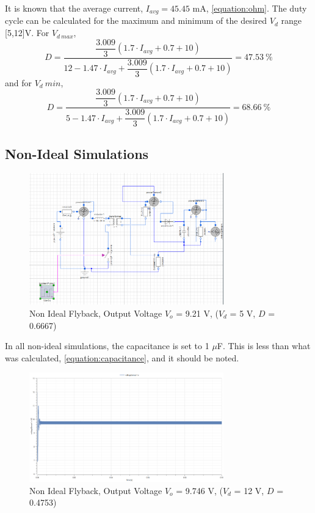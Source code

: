 \documentclass[12pt,twoside]{scrartcl}
\begin{document}
    It is known that the average current, $I_{avg} = 45.45$ mA, \ref{equation:ohm}. The duty cycle can 
    be calculated for the maximum and minimum of the desired $V_d$ range [5,12]V. For $V_{d\:max}$,
    \begin{equation}
        D  = \frac{\dfrac{3.009}{3}(1.7\cdot I_{avg} + 0.7 + 10)}{12 - 1.47\cdot I_{avg} + \dfrac{3.009}{3}(1.7\cdot I_{avg} + 0.7 + 10)} = 47.53\: \%
    \end{equation}
    and for $V_d\:min$,
    \begin{equation}
        D  = \frac{\dfrac{3.009}{3}(1.7\cdot I_{avg} + 0.7 + 10)}{5 - 1.47\cdot I_{avg} + \dfrac{3.009}{3}(1.7\cdot I_{avg} + 0.7 + 10)} = 68.66\: \%
    \end{equation}

\newpage

\subsection{Non-Ideal Simulations}

\begin{figure}[htp]
    \centering
    \includegraphics[width=0.75\textwidth]{ModellicaNonIdeal.PNG}
    \caption{Non Ideal Flyback, Output Voltage $V_o$ = 9.21 V, ($V_d$ = 5 V, $D$ = 0.6667)}
    \label{fig:NonIdealModellica}
\end{figure}
\noindent
In all non-ideal simulations, the capacitance is set to 1 $\mu$F. This is less than what was calculated, \ref{equation:capacitance}, and it should be noted.

\newpage
\begin{figure}[htp]
    \centering
    \includegraphics[width=0.75\textwidth]{NonIdealSim12V(calculated).png}
    \caption{Non Ideal Flyback, Output Voltage $V_o$ = 9.746 V, ($V_d$ = 12 V, $D$ = 0.4753)}
    \label{fig:NonIdealSim12Vcal}
\end{figure}
\end{document}
